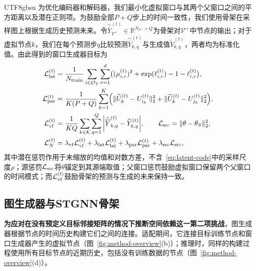 \documentclass[runningheads,a4paper]{llncs}
\begin{document}
\begin{CJK*}{UTF8}{gbsn}
为优化编码器和解码器，我们最小化虚拟窗口与其两个父窗口之间的平方距离以及潜在正则项。为鼓励全部$P+Q$步上的时间一致性，我们使用骨架在采样图上根据生成历史预测未来。令$\widehat{\overline Y}_{\mathcal V^{+}}^{(t)}\in\mathbb R^{N_{\mathcal V^{+}}\times Q}$为骨架对$\mathcal V^{+}$中节点的输出；对于虚拟节点$k$，我们在每个预测步$q$比较预测$\widehat{\overline Y}_{k,q}^{(t)}$与生成值$\widetilde Y_{k,q}^{(t)}$，两者均为标准化值。由此得到的窗口生成器目标为
\begin{equation}
\begin{aligned}
  \mathcal L_{\rm lat}^{(t)}&=\frac{1}{\text{$N_{\mathrm{train}}$}}\sum_{i\in\mathcal O_{T}}\sum_{r=1}^{d}
      \bigl((\mu_{i,r}^{(t)})^2+\exp(\ell_{i,r}^{(t)})-1-\ell_{i,r}^{(t)}\bigr),\\
  \mathcal L_{\rm par}^{(t)}&=\frac{1}{K(P+Q)}\sum_{k=1}^{K}
      \Bigl(\|\widetilde U_k^{(t)}-U_{i_k}^{(t)}\|_2^2+\|\widetilde U_k^{(t)}-U_{j_k}^{(t)}\|_2^2\Bigr),\\
  \mathcal L_{\rm vf}^{(t)}&=
      \text{$\displaystyle\frac{1}{KQ}\sum_{k\in\mathcal K}\sum_{q=1}^{Q}
      \left|\widehat{\overline Y}_{k,q}^{(t)}-\widetilde Y_{k,q}^{(t)}\right|$},
      \qquad\mathcal L_{\rm src}=\|\theta-\theta_S\|_2^2,\\
  \mathcal L_N^{(t)}&=\lambda_{\rm vf}\mathcal L_{\rm vf}^{(t)}+\lambda_{\rm lat}\mathcal L_{\rm lat}^{(t)}
      +\lambda_{\rm par}\mathcal L_{\rm par}^{(t)}+\lambda_{\rm src}\mathcal L_{\rm src},
\end{aligned}
  \label{eq:node-objectives}
\end{equation}
其中潜在惩罚作用于未缩放的均值和对数方差，不含~\eqref{eq:latent-code}中的采样尺度$\rho$；源惩罚$\mathcal L_{\rm src}$将$\theta$锚定到其源端取值；父窗口惩罚鼓励虚拟窗口保留两个父窗口的时间模式；而$\mathcal L_{\rm vf}^{(t)}$鼓励骨架的预测与生成的未来保持一致。

\subsection{图生成器与STGNN骨架}
\label{sec:graph-generator}

\textbf{为应对在没有预定义目标邻接矩阵的情况下推断空间依赖这一第二项挑战}，图生成器根据节点的时间历史构建它们之间的连接。适配期间，它连接目标训练节点和窗口生成器产生的虚拟节点（图~\ref{fig:method-overview}(b)）；推理时，同样的构建过程使用所有目标节点的近期历史，包括没有训练数据的节点（图~\ref{fig:method-overview}(d)）。


\end{CJK*}
\end{document}
